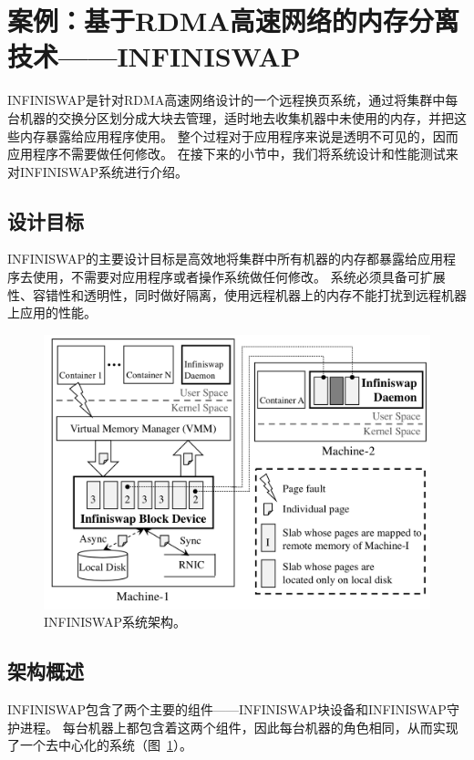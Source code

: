 
\section{案例：基于RDMA高速网络的内存分离技术——INFINISWAP}

INFINISWAP是针对RDMA高速网络设计的一个远程换页系统，通过将集群中每台机器的交换分区划分成大块去管理，适时地去收集机器中未使用的内存，并把这些内存暴露给应用程序使用。
整个过程对于应用程序来说是透明不可见的，因而应用程序不需要做任何修改。
在接下来的小节中，我们将系统设计和性能测试来对INFINISWAP系统进行介绍。

\subsection{设计目标}
INFINISWAP的主要设计目标是高效地将集群中所有机器的内存都暴露给应用程序去使用，不需要对应用程序或者操作系统做任何修改。
系统必须具备可扩展性、容错性和透明性，同时做好隔离，使用远程机器上的内存不能打扰到远程机器上应用的性能。

\begin{figure}
\centering
\includegraphics[scale=0.5]{Figures/memory/infiniswap_architecture.png}
\decoRule
\caption{INFINISWAP系统架构。\cite{gu2017efficient}}
\label{fig:infiniswap_architecture}
\end{figure}

\subsection{架构概述}
INFINISWAP包含了两个主要的组件——INFINISWAP块设备和INFINISWAP守护进程。
每台机器上都包含着这两个组件，因此每台机器的角色相同，从而实现了一个去中心化的系统（图~\ref{fig:infiniswap_architecture}）。

